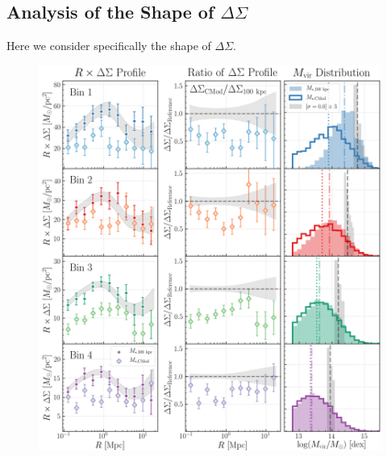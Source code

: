 \documentclass[a4paper,fleqn,usenatbib]{mnras}
\begin{document}
\subsection{Analysis of the Shape of $\Delta\Sigma$}

Here we consider specifically the shape of $\Delta\Sigma$. 


  \begin{figure}
      \centering 
      \includegraphics[width=\textwidth]{figure/topn_dsigma_m100_cmod_compare}
      \caption{
          }
      \label{fig:m100_cmod}
  \end{figure}
\end{document}
